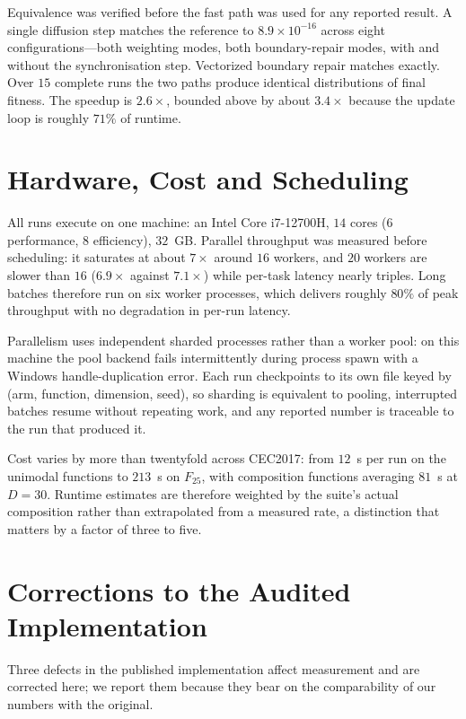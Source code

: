 \documentclass[lettersize,journal]{IEEEtran}
\begin{document}
Equivalence was verified before the fast path was used for any reported result.
A single diffusion step matches the reference to $8.9\times10^{-16}$ across
eight configurations---both weighting modes, both boundary-repair modes, with
and without the synchronisation step. Vectorized boundary repair matches
exactly. Over $15$ complete runs the two paths produce identical distributions
of final fitness. The speedup is $2.6\times$, bounded above by about
$3.4\times$ because the update loop is roughly $71\%$ of runtime.

\section{Hardware, Cost and Scheduling}
\label{sec:supp:hardware}

All runs execute on one machine: an Intel Core i7-12700H, $14$ cores
($6$ performance, $8$ efficiency), $32$~GB. Parallel throughput was measured
before scheduling: it saturates at about $7\times$ around $16$ workers, and
$20$ workers are slower than $16$ ($6.9\times$ against $7.1\times$) while
per-task latency nearly triples. Long batches therefore run on six worker
processes, which delivers roughly $80\%$ of peak throughput with no degradation
in per-run latency.

Parallelism uses independent sharded processes rather than a worker pool: on
this machine the pool backend fails intermittently during process spawn with a
Windows handle-duplication error. Each run checkpoints to its own file keyed by
(arm, function, dimension, seed), so sharding is equivalent to pooling,
interrupted batches resume without repeating work, and any reported number is
traceable to the run that produced it.

Cost varies by more than twentyfold across CEC2017: from $12$~s per run on the
unimodal functions to $213$~s on $F_{25}$, with composition functions averaging
$81$~s at $D=30$. Runtime estimates are therefore weighted by the suite's
actual composition rather than extrapolated from a measured rate, a
distinction that matters by a factor of three to five.

\section{Corrections to the Audited Implementation}
\label{sec:supp:corrections}

Three defects in the published implementation affect measurement and are
corrected here; we report them because they bear on the comparability of our
numbers with the original.
\end{document}
